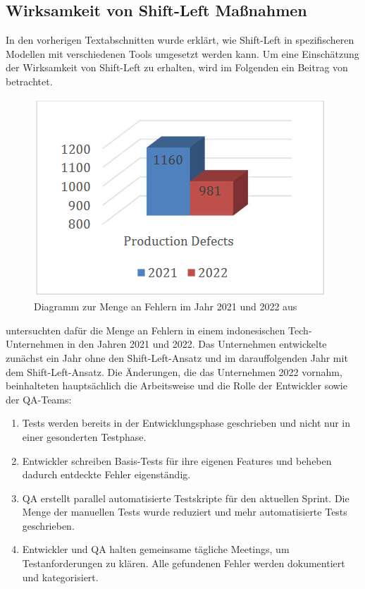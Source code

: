 \subsection{Wirksamkeit von Shift-Left Maßnahmen}

In den vorherigen Textabschnitten wurde erklärt, wie Shift-Left in spezifischeren Modellen mit verschiedenen Tools umgesetzt werden kann. Um eine Einschätzung der Wirksamkeit von Shift-Left zu erhalten, wird im Folgenden ein Beitrag von \citet{andriadi_impact_2023} betrachtet.

\begin{figure}
\centering
\includegraphics[width=0.9\linewidth]{images/Impact_production_defects.png}
\caption{Diagramm zur Menge an Fehlern im Jahr 2021 und 2022 aus \cite{andriadi_impact_2023}}
\label{fig:production_defects }
\end{figure}

\citet{andriadi_impact_2023} untersuchten dafür die Menge an Fehlern in einem indonesischen Tech-Unternehmen in den Jahren 2021 und 2022. Das Unternehmen entwickelte zunächst ein Jahr ohne den Shift-Left-Ansatz und im darauffolgenden Jahr mit dem Shift-Left-Ansatz. Die Änderungen, die das Unternehmen 2022 vornahm, beinhalteten hauptsächlich die Arbeitsweise und die Rolle der Entwickler sowie der QA-Teams:
\begin{enumerate}
\item Tests werden bereits in der Entwicklungsphase geschrieben und nicht nur in einer gesonderten Testphase.
\item Entwickler schreiben Basis-Tests für ihre eigenen Features und beheben dadurch entdeckte Fehler eigenständig.
\item QA erstellt parallel automatisierte Testskripte für den aktuellen Sprint. Die Menge der manuellen Tests wurde reduziert und mehr automatisierte Tests geschrieben.
\item Entwickler und QA halten gemeinsame tägliche Meetings, um Testanforderungen zu klären. Alle gefundenen Fehler werden dokumentiert und kategorisiert.
\end{enumerate}

